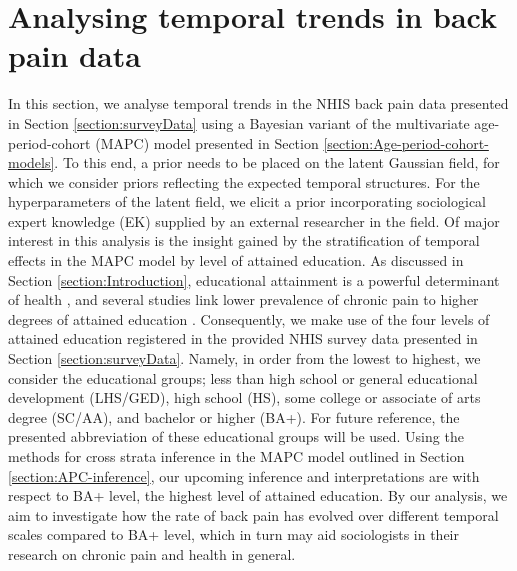 \section{Analysing temporal trends in back pain data}
\label{section:Application1}
In this section, we analyse temporal trends in the NHIS back pain data presented in Section \ref{section:surveyData} using a Bayesian variant of the multivariate age-period-cohort (MAPC) model presented in Section \ref{section:Age-period-cohort-models}. To this end, a prior needs to be placed on the latent Gaussian field, for which we consider priors reflecting the expected temporal structures. For the hyperparameters of the latent field, we elicit a prior incorporating sociological expert knowledge (EK) supplied by an external researcher in the field. Of major interest in this analysis is the insight gained by the stratification of temporal effects in the MAPC model by level of attained education. As discussed in Section \ref{section:Introduction}, educational attainment is a powerful determinant of health \citep{mirowsky2017education}, and several studies link lower prevalence of chronic pain to higher degrees of attained education \citep{dionne2001formal,kennedy2014prevalence}. Consequently, we make use of the four levels of attained education registered in the provided NHIS survey data presented in Section \ref{section:surveyData}. Namely, in order from the lowest to highest, we consider the educational groups; less than high school or general educational development (LHS/GED), high school (HS), some college or associate of arts degree (SC/AA), and bachelor or higher (BA+). For future reference, the presented abbreviation of these educational groups will be used. Using the methods for cross strata inference in the MAPC model outlined in Section \ref{section:APC-inference}, our upcoming inference and interpretations are with respect to BA+ level, the highest level of attained education. By our analysis, we aim to investigate how the rate of back pain has evolved over different temporal scales compared to BA+ level, which in turn may aid sociologists in their research on chronic pain and health in general.

